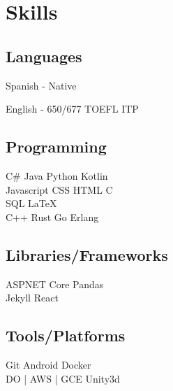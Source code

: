 \documentclass[]{plushcv}
\begin{document}
\begin{minipage}[t]{0.25\textwidth}


    \section{Skills}
    \subsection*{Languages}
    \begin{tightemize}
        \sectionsep
        \item Spanish - Native
        \item English - 650/677 TOEFL ITP
    \end{tightemize}

    \subsection{Programming}
    \sectionsep
    C\# \textbullet{} Java \textbullet{} Python \textbullet{} Kotlin \\
    \sectionsep
    Javascript \textbullet{} CSS \textbullet{} HTML \textbullet{} C \\
    SQL \textbullet{} \LaTeX \\
    \sectionsep
    C++ \textbullet{}  Rust \textbullet{} Go \textbullet{} Erlang \\
    \sectionsep
    \sectionsep
    \subsection{Libraries/Frameworks}
    \sectionsep
    ASPNET Core \textbullet{} Pandas \\ Jekyll \textbullet{} React \\
    \sectionsep
    \sectionsep
    \subsection{Tools/Platforms}
    \sectionsep
    Git \textbullet{} Android \textbullet{} Docker \\ DO | AWS | GCE \textbullet{} Unity3d \\

    \sectionsep


\end{minipage}
\end{document}
